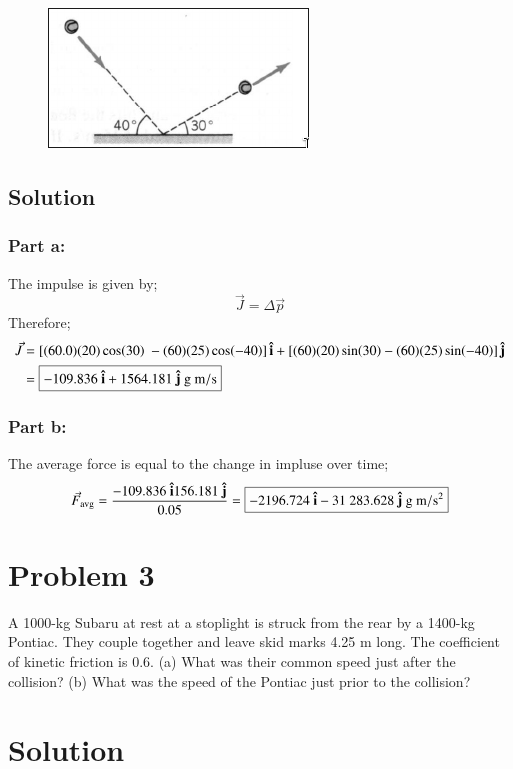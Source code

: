 \documentclass{article}
\begin{document}
\begin{figure}[ht]
    \centering
    \includegraphics[scale=0.5]{drawing-1.png}
\end{figure}

\subsection*{Solution}
\subsubsection*{Part a:}
The impulse is given by;
\[
	\vec{J} = \Delta \vec{p}
\]
Therefore;
\begin{align*}
	\vec{J} &= \left[ (60.0)(20)\cos(30)\ - (60)(25)\cos(-40) \right] \vu {i} + \left[ (60)(20)\sin(30)  - (60)(25)\sin(-40)\right] \vu{j} \\
		&= \boxed{-109.836\ \vu i + 1564.181\ \vu j \ \text{g}\ \text{m}/\text{s}}
\end{align*}

\subsubsection*{Part b:}
The average force is equal to the change in impluse over time;
\[
	\vec{F}_\text{avg} = \frac{-109.836\ \vu i 156.181\ \vu j}{0.05} = \boxed{-2196.724\ \vu{i} -31\ 283.628\ \vu{j} \ \text{g}\ \text{m}/\text{s}^2}
\]

\section*{Problem 3}
A 1000-kg Subaru at rest at a stoplight is struck from the rear by a 1400-kg Pontiac. They
couple together and leave skid marks 4.25 m long. The coefficient of kinetic friction is 0.6. (a)
What was their common speed just after the collision? (b) What was the speed of the Pontiac just
prior to the collision?

\section*{Solution}
\end{document}
